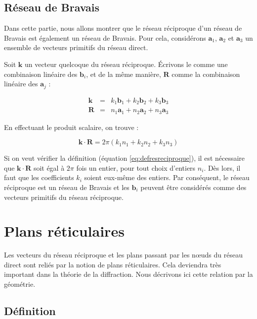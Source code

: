 \subsection{Réseau de Bravais}

Dans cette partie, nous allons montrer que le réseau réciproque d'un réseau de Bravais est également un réseau de Bravais. Pour cela, considérons $\mathbf{a}_1$, $\mathbf{a}_2$ et $\mathbf{a}_3$ un ensemble de vecteurs primitifs du réseau direct.

Soit $\mathbf{k}$ un vecteur quelcoque du réseau réciproque. Écrivons le comme une combinaison linéaire des $\mathbf{b}_i$, et de la même manière, $\mathbf{R}$ comme la combinaison linéaire des $\mathbf{a}_j$ :

\begin{eqnarray}
    \mathbf{k} & = & k_1 \mathbf{b}_1 + k_2 \mathbf{b}_2 + k_3 \mathbf{b}_3\\
    \mathbf{R} & = & n_1 \mathbf{a}_1 + n_2 \mathbf{a}_2 + n_3 \mathbf{a}_3
\end{eqnarray}

En effectuant le produit scalaire, on trouve :

\begin{equation}
    \mathbf{k}\cdot\mathbf{R} = 2\pi (k_1 n_1 + k_2n_2 + k_3n_3)
\end{equation}

Si on veut vérifier la définition (équation \ref{eq:defresreciproque}), il est nécessaire que $\mathbf{k}\cdot\mathbf{R}$ soit égal à $2\pi$ fois un entier, pour tout choix d'entiers $n_i$. Dès lors, il faut que les coefficients $k_i$ soient eux-même des entiers. Par conséquent, le réseau réciproque est un réseau de Bravais et les $\mathbf{b}_i$ peuvent être considérés comme des vecteurs
primitifs du réseau réciproque.

\section{Plans réticulaires}

Les vecteurs du réseau réciproque et les plans passant par les nœuds du réseau direct sont reliés par la notion de plans réticulaires. Cela deviendra très important dans la théorie de la diffraction. Nous décrivons ici cette relation par la géométrie.

\subsection{Définition}

